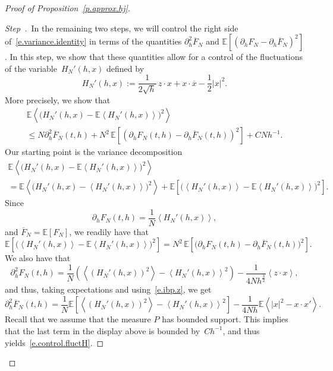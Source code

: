 \documentclass[AHL,Unicode,longabstracts,published]{cedram}
\newcommand{\E}{\mathbb{E}}
\newcommand{\1}{\mathds{1}}
\renewcommand{\le}{\leqslant}
\newcommand{\la}{\left\langle}
\newcommand{\ra}{\right\rangle}
\renewcommand{\bar}{\overline}
\newcounter{stepcount}
\newenvironment{step}{\refstepcounter{stepcount}\begin{proof}[Step~\thestepcount]}{\let\qed\relax\end{proof}}
\begin{document}
\begin{proof}[Proof of Proposition~\ref{p.approx.hj}]

\begin{step}\label{st2}
\,In the remaining two steps, we will control the right side of~\eqref{e.variance.identity} in terms of the quantities $\partial_h^2 \bar F_N$ and $\E [(\partial_h F_N - \partial_h \bar F_N)^2 ]$. In this step, we show that these quantities allow for a control of the fluctuations of the variable~$H_N'(h,x)$ defined by
\[
H_N'(h,x) := \frac 1 {2\sqrt {h}} \, z \cdot x + x \cdot \bar x - \frac 1 2 |x|^2.
\]
More precisely, we show that
\begin{multline}\label{e.control.fluctH}
\E \la \big(H_N'(h,x) - \E \la H_N'(h,x) \ra \big) ^2 \ra
\\
\le N \partial_h^2 \bar F_N(t,h) + N^2 \, \E \left[\left(\partial_h F_N(t,h) - \partial_h \bar F_N(t,h) \right) ^2 \right] + C N h^{-1}.
\end{multline}
Our starting point is the variance decomposition
\begin{multline*}
\E \la \big(H_N'(h,x) - \E \la H_N'(h,x) \ra \big) ^2 \ra
\\
= \E \la \big(H_N'(h,x) - \la H_N'(h,x) \ra\big)^2 \ra + \E \left[\big(\la H_N'(h,x) \ra - \E \la H_N'(h,x) \ra\big)^2 \right].
\end{multline*}
Since
\begin{equation}\label{e.formula.partialhF}
\partial_{h} F_N(t,{h}) = \frac 1 N \la H_N'({h},x) \ra,
\end{equation}
and $\bar F_N = \E [F_N]$, we readily have that
\begin{equation*}
\E \left[\big(\la H_N'(h,x) \ra - \E \la H_N'(h,x) \ra\big)^2 \right] = N^2 \, \E \left[\big(\partial_h F_N(t,h) - \partial_h \bar F_N(t,h) \big) ^2 \right].
\end{equation*}
We also have that
\begin{equation}\label{e.partialh2F}
\partial_{h}^2 F_N(t,{h}) = \frac{1}{N} \left(\la \left(H_N'({h},x)\right)^2 \ra -\la H_N'({h},x) \ra^2 \right) - \frac {1}{4N{h}^\frac 3 2} \la z \cdot x \ra,
\end{equation}
and thus, taking expectations and using~\eqref{e.ibp.z}, we get
\[
\partial_{h}^2 \bar F_N(t,{h}) = \frac{1}{N} \E \left[\la \left(H_N'({h},x)\right)^2 \ra -\la H_N'({h},x) \ra^2 \right] - \frac 1 {4N {h}} \E \la |x|^2 - x \cdot x' \ra.
\]
Recall that we assume that the measure $P$ has bounded support. This implies that the last term in the display above is bounded by~$C h^{-1}$, and thus yields~\eqref{e.control.fluctH}.
\end{step}


\end{proof}
\end{document}
